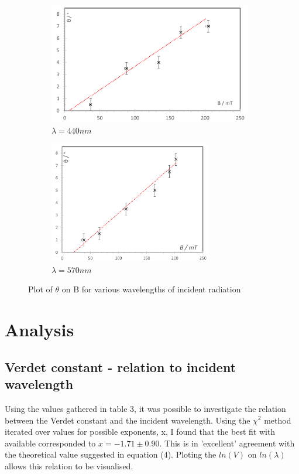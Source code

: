 \documentclass{article}%
\begin{document}
\begin{figure}[H]
    \begin{subfigure}{0.475\textwidth}
        \includegraphics[width=\textwidth, height=200px]{blue.png}
        \caption{$\lambda = 440nm$}
        \label{fig:third}
    \end{subfigure}
    \hfill
    \begin{subfigure}{0.475\textwidth}
        \includegraphics[width=\textwidth, height=200px]{white.png}
        \caption{$\lambda = 570nm$}
        \label{fig:third}
    \end{subfigure}
    \hfill
    \caption{Plot of $\theta$ on B for various wavelengths of incident radiation}
    \label{fig:figures}
\end{figure}

\section{Analysis}
\subsection{Verdet constant - relation to incident wavelength}

Using the values gathered in table 3, it was possible to investigate the relation between the Verdet constant and the incident wavelength. Using the $\chi^{2}$ method iterated over values for possible exponents, x, I found that the best fit with available corresponded to $x = -1.71 \pm 0.90 $.
This is in 'excellent' agreement \cite{HH} with the theoretical value suggested in equation (4). Ploting the $ln(V)$ on $ln(\lambda)$ allows this relation to be visualised.
\end{document}
